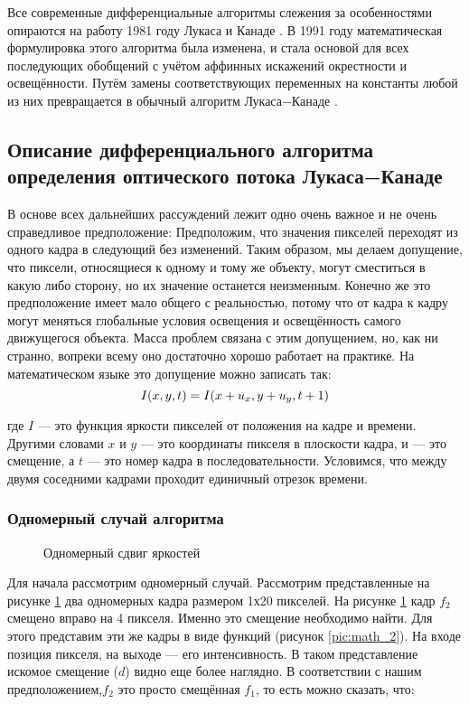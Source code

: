 Все современные дифференциальные алгоритмы слежения за особенностями опираются на работу 1981 году Лукаса и Канаде \cite{Lucas1981}. В 1991 году математическая формулировка этого алгоритма была изменена, и стала основой для всех последующих обобщений с учётом аффинных искажений окрестности и освещённости. Путём замены соответствующих переменных на константы любой из них превращается в обычный алгоритм Лукаса−Канаде \cite{lk_jou}.
\subsection{Описание дифференциального алгоритма определения оптического потока Лукаса−Канаде}
\label{subsec:lycas_kanade_81}
В основе всех дальнейших рассуждений лежит одно очень важное и не очень справедливое предположение: Предположим, что значения пикселей переходят из одного кадра в следующий без изменений. Таким образом, мы делаем допущение, что пиксели, относящиеся к одному и тому же объекту, могут сместиться в какую либо сторону, но их значение останется неизменным. Конечно же это предположение имеет мало общего с реальностью, потому что от кадра к кадру могут меняться глобальные условия освещения и освещённость самого движущегося объекта. Масса проблем связана с этим допущением, но, как ни странно, вопреки всему оно достаточно хорошо работает на практике. На математическом языке это допущение можно записать так:
\begin{equation}
\numberwithin{equation}{section}
\label{eq:f_0}
I(x,y,t)=I(x+u_x,y+u_y,t+1)
\end{equation}

где $I$ — это функция яркости пикселей от положения на кадре и времени. Другими словами $x$ и $y$ — это координаты пикселя в плоскости кадра, и — это смещение, а $t$ — это номер кадра в последовательности. Условимся, что между двумя соседними кадрами проходит единичный отрезок времени.
\subsubsection{Одномерный случай алгоритма}

\begin{figure}[ht]
\caption{Одномерный сдвиг яркостей}
\label{pic:math_1}
\end{figure}

Для начала рассмотрим одномерный случай. Рассмотрим представленные на рисунке \ref{pic:math_1} два одномерных кадра размером 1х20 пикселей. На рисунке \ref{pic:math_1} кадр $f_2$ смещено вправо на 4 пикселя. Именно это смещение необходимо найти. Для этого представим эти же кадры в виде функций (рисунок \ref{pic:math_2}). На входе позиция пикселя, на выходе — его интенсивность. В таком представление искомое смещение ($d$) видно еще более наглядно. В соответствии с нашим предположением,$f_2$ это просто смещённая $f_1$, то есть можно сказать, что:

